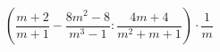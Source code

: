 \begin{ex}[type=expression]
	\begin{condition}
		\( \left( \dfrac{m+2}{m+1}-\dfrac{8m^2-8}{m^3-1}:\dfrac{4m+4}{m^2+m+1} \right)\cdot\dfrac{1}{m} \)
	\end{condition}
\end{ex}